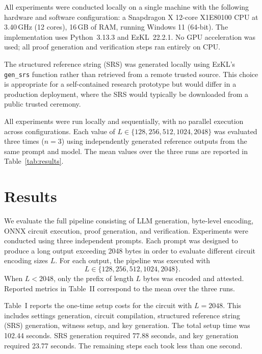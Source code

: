 \documentclass[10pt,conference,a4paper]{IEEEtran}
\begin{document}
All experiments were conducted locally on a single machine with the following hardware and software configuration: a Snapdragon X 12-core X1E80100 CPU at 3.40\,GHz (12 cores), 16\,GB of RAM, running Windows 11 (64-bit). The implementation uses Python~3.13.3 and EzKL~22.2.1. No GPU acceleration was used; all proof generation and verification steps ran entirely on CPU.

The structured reference string (SRS) was generated locally using EzKL's \texttt{gen\_srs} function rather than retrieved from a remote trusted source. This choice is appropriate for a self-contained research prototype but would differ in a production deployment, where the SRS would typically be downloaded from a public trusted ceremony.

All experiments were run locally and sequentially, with no parallel execution across configurations. Each value of $L \in \{128, 256, 512, 1024, 2048\}$ was evaluated three times ($n = 3$) using independently generated reference outputs from the same prompt and model. The mean values over the three runs are reported in Table~\ref{tab:results}.

\section{Results}

We evaluate the full pipeline consisting of LLM generation, byte-level encoding, ONNX circuit execution, proof generation, and verification. Experiments were conducted using three independent prompts. Each prompt was designed to produce a long output exceeding 2048 bytes in order to evaluate different circuit encoding sizes $L$. For each output, the pipeline was executed with \[L \in \{128, 256, 512, 1024, 2048\}.\]
When $L < 2048$, only the prefix of length $L$ bytes was encoded and attested. Reported metrics in Table~II correspond to the mean over the three runs.

Table~I reports the one-time setup costs for the circuit with $L = 2048$. This includes settings generation, circuit compilation, structured reference string (SRS) generation, witness setup, and key generation. The total setup time was 102.44 seconds. SRS generation required 77.88 seconds, and key generation required 23.77 seconds. The remaining steps each took less than one second.
\end{document}
